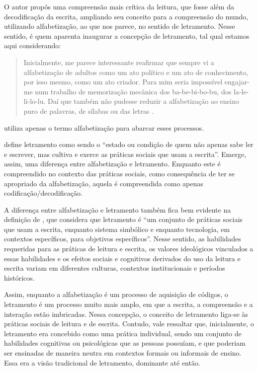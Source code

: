 \documentclass{textolivre}
\begin{document}
O autor propôs uma compreensão mais crítica da leitura, que fosse além da
decodificação da escrita, ampliando seu conceito para a compreensão do mundo,
utilizando alfabetização, ao que nos parece, no sentido de letramento. Nesse
sentido, \textcite{freire1989} é quem aparenta inaugurar a concepção de letramento, tal
qual estamos aqui considerando:
\begin{quote}
Inicialmente, me parece interessante reafirmar que sempre vi a alfabetização de
adultos como um ato político e um ato de conhecimento, por isso mesmo, como um
ato criador. Para mim seria impossível engajar-me num trabalho de memorização
mecânica dos ba-be-bi-bo-bu, dos la-le-li-lo-lu. Daí que também não pudesse
reduzir a alfabetização ao ensino puro de palavras, de sílabas ou das letras
\cite[p. 13]{freire1989}.
\end{quote}

\textcite{freire1989} utiliza apenas o termo alfabetização para abarcar esses processos.

\textcite[p. 47]{soares2004} define letramento como sendo o “estado ou condição
de quem não apenas sabe ler e escrever, mas cultiva e exerce as práticas
sociais que usam a escrita”. Emerge, assim, uma diferença entre alfabetização e
letramento. Enquanto este é compreendido no contexto das práticas sociais, como
consequência de ter se apropriado da alfabetização, aquela é compreendida como
apenas codificação/decodificação.

A diferença entre alfabetização e letramento também fica bem evidente na
definição de \textcite[p. 19]{kleiman2003}, que considera que letramento é “um conjunto
de práticas sociais que usam a escrita, enquanto sistema simbólico e enquanto
tecnologia, em contextos específicos, para objetivos específicos”. Nesse
sentido, as habilidades requeridas para as práticas de leitura e escrita, os
valores ideológicos vinculados a essas habilidades e os efeitos sociais e
cognitivos derivados do uso da leitura e escrita variam em diferentes culturas,
contextos institucionais e períodos históricos.

Assim, enquanto a alfabetização é um processo de aquisição de códigos, o
letramento é um processo muito mais amplo, em que a escrita, a compreensão e a
interação estão imbricadas. Nessa concepção, o conceito de letramento liga-se
às práticas sociais de leitura e de escrita. Contudo, vale ressaltar que,
inicialmente, o letramento era concebido como uma prática individual, sendo um
conjunto de habilidades cognitivas ou psicológicas que as pessoas possuíam, e
que poderiam ser ensinadas de maneira neutra em contextos formais ou informais
de ensino. Essa era a visão tradicional de letramento, dominante até então.
\end{document}
